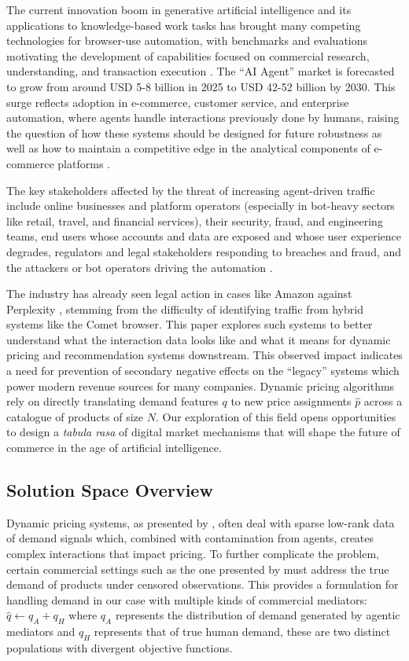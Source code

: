 The current innovation boom in generative artificial intelligence and its applications to knowledge-based work tasks has brought many competing technologies for browser-use automation, with benchmarks and evaluations \parencite{xia_evaluation-driven_2025} motivating the development of capabilities focused on commercial research, understanding, and transaction execution \parencite{xie_osworld_2024}. The ``AI Agent'' market is forecasted to grow from around USD 5-8 billion in 2025 to USD 42-52 billion by 2030. This surge reflects adoption in e-commerce, customer service, and enterprise automation, where agents handle interactions previously done by humans, raising the question of how these systems should be designed for future robustness as well as how to maintain a competitive edge in the analytical components of e-commerce platforms \parencite{markntel_advisors_global_2025}.

The key stakeholders affected by the threat of increasing agent-driven traffic include online businesses and platform operators (especially in bot-heavy sectors like retail, travel, and financial services), their security, fraud, and engineering teams, end users whose accounts and data are exposed and whose user experience degrades, regulators and legal stakeholders responding to breaches and fraud, and the attackers or bot operators driving the automation \parencite{imperva_rapid_2025}.

The industry has already seen legal action in cases like Amazon against Perplexity \parencite{ghaffary_amazon_2025}, stemming from the difficulty of identifying traffic from hybrid systems like the Comet browser. This paper explores such systems to better understand what the interaction data looks like and what it means for dynamic pricing and recommendation systems downstream. This observed impact indicates a need for prevention of secondary negative effects on the ``legacy'' systems which power modern revenue sources for many companies. Dynamic pricing algorithms rely on directly translating demand features $q$ to new price assignments $\hat{p}$ across a catalogue of products of size $N$. Our exploration of this field opens opportunities to design a \textit{tabula rasa} of digital market mechanisms that will shape the future of commerce in the age of artificial intelligence.

\subsection{Solution Space Overview}
Dynamic pricing systems, as presented by \textcite{mueller_low-rank_2019}, often deal with sparse low-rank data of demand signals which, combined with contamination from agents, creates complex interactions that impact pricing. To further complicate the problem, certain commercial settings such as the one presented by \textcite{amjad_censored_2017} must address the true demand of products under censored observations. This provides a formulation for handling demand in our case with multiple kinds of commercial mediators: $\hat{q} \gets q_A + q_H$ where $q_A$ represents the distribution of demand generated by agentic mediators and $q_H$ represents that of true human demand, these are two distinct populations with divergent objective functions.

